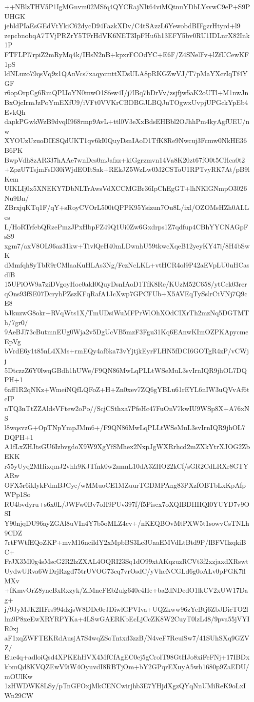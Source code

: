 ++NBlzTHV5P1IgMGnvm02MSfq4QYCRajNIt64viMQtnuYDbLYsvwC9eP+S9PUHGK
jebldPIaEsGEdVtYkiC62dycD94FazkXDv/C4tSAzzL6YewobdBIFgzrHtyrd+l9
zepcbnobqA7TVjPRZrY5TFrHdVK6NET3IpFHu6h13EFY5bv0RU1IDLnrX82Ink1P
FTFLPl7rpiZ2mRyMq4k/IHsN2nB+kpxrFCOdYC+E6F/Z4SNelFv+lZfUCewKF1pS
ldNLuzo79qsVq9z1QAnVcs7xaqycmttXDsULA8pRKGZwVJ/T7pMaYXcrIqTf4YGF
r6opOrpCg6RmQPIJoYN0mwO1Sfew4I/j7lBq7bDrVv/zsjfjw5aK2oUTl+M1nwJn
BxOjcIrmJzPoYmEXfU9/iVFt0VVKrCBDBGJLBQJuTOgwxUvpjUPGckYpEb4EvkQh
dapkPGwkWzB9dvqlI968rmp9AvL+ttl0V3eXxBdsEHBbl2OJhhPm4kyAgfUEU/nw
XYOUzUzuoDIESQdUKT1qv6kI0QuyDsnIAoD1TfK8Re9Nwcuj3Fcmw0NkHE36B6PK
BwpVdh8zAR337hAAe7wnDcs0mJafzz+kiGgrzmvn14Va8K20zt67fO0t5CHca0t2
+ZpzU7TsjmFsD30iWjdEOItSak+REkJZ5WzLw0M2CSToU1RPTvyRK7At/pB9lKem
UIKLIj0x5XNEKY7DbNLTrAwsVdXCCMGBr36IpChEgGT+lhNKlGNmpO3026Nu9Bn/
ZBrxjqKTq1F/qY+sRoyCVOrL500tQPPK95Ysizun7Ou8L/ixl/OZOMsHZh0ALLes
L/HoRTrfebQRzePmzJPxHbpFZ49Q1Ui0Zw6Gxdrps1Z7qdfup4CBhYYCNAGpFsS9
xgm7/axV8OL96az31kw+TivlQeH40mLDwnhU59tkwcXqeB12yeyKY47i/8H4bSwK
dMmfqh8yTbR9rCMlaaKuHLAs3Ng/FczNcLKL+vtHCR4ol9P42aEVpLU0uHCasdlB
15UPiOW9a7ziDVgoyHoe0akI0QuyDsnIAoD1TfK8Re/KUzM52C658/ytCck03rer
qOns93fSE07DcryhPZszKFqRafA1JcXwp7GPCFUb+X5AVEqTySslrCtVNj7Q9cE8
bJkuzwG8okr+RVqWts1X/TmUDsiWuMFPrWlOhXOdCIXrTh2mzNq5DGTMTh/7gr0/
9AeBJl73cButmnEUg0Wja2v5DgUcVB5mzF3Fgu31Kq6EAnwKImOZPKApycmeEpVg
bVrdE6y1t85nL4XMs+rmEQy4af6ka73vYjtjkEyrFLHN5fDCI6GOTgR4zP/vCWjj
5DtczzZ6Y0lwqGBdh1hUWe/F9QN86MwLqPLLtWSeMuL3svIrnIQR9jhOL7DQPH+1
6aff1R2qNKz+WmeiNQfLQFoZ+H+Zn0xev7ZQ6gYBLu61rEYL6nIW3uQVvAf6tcIP
nTQ3nTtZZAldsVFtew2oPo//ScjCSthxa7PfeHc47FuOnV7kwIU9WSp8X+A76xNS
l8wqsvzG+OpTNpYmpJMm6+/F9QN86MwLqPLLtWSeMuL3svIrnIQR9jhOL7DQPH+1
A1fLxZHJtsGU6IzbvgdoX9W9XgYfSMhex2NxpJgWXRrhcd2mZXkYtrXJOG2ZbEKK
r55yUyq2MHixqmJ2vhh9KJTfnk0w2zmnL10dA3ZHO22kCf/sGR2CdLRXr8GTYARw
OFX5r6iklykPdmBJCye/wMMuoCE1MZuurTGDMPAng83PXzfOBTbLxKpAfpWPp1So
RU4bvdyru+s6x0L/JWFw0Bv7oH9PUv397f/f5Pisex7oXQIBDHHQI0YUYD7v9OSI
Y90njqDU96ayZGAl8uVIn4Y7b5oMLZ4cv+/nKEQBOvMtPXW5t1sowvCsTNLh9CDZ
7rtFWtfEQoZKP+mvM16ncildY2xMpbBS3Lc3UaaEMVdLtBtd9P/lBFVIlzqkiBC+
FrJX3Ml0g4sMscG2R2lzZXAL4OQRI23Sq1dO99xtAKqzuzRCVt3f2xzjaxdXRswt
UydwURva6WDrjRzgd75trUVOG73cq7vrOsdC/yVhcNCGLd6g0oALv0pPGK7flMXv
+fKmvOrZ8yneBxRxzyk/ZlMncFEb2ulg640c4He+ba2dNDedO1lkCV2xUW17Dag+
j/9JyMJK2HFrs994dzjsW8DDc0eJDiwlGPVIva+UQZkww96zYeBtj6ZbJDicTO2l
lm9P8xeEwXRYRPYKa+4LSwGAERKbEcLjCcZK8W2CuyT0lzL48/9pva55jVYIR0xj
aF1xqZWFTEKRdAusjA7S4wqZSoTntxd3zzB/N4veF7ReuiSw7/41SUhSXq9GZVZ/
Eue4q+adloiQsd4XPKEhHVX4MfCfAgEC0ej5gCrolT98GtHJo8xiFeFNj+17IBDx
kbmQd8KVQZEwV9iW4OyuvdI8RBTjOm+bY2GPqrEXuyA5wh1680p9ZaEDU/mOUlKw
1zHWDWK8LSy/pTnGFOxjMkCENCwirjhb3E7YHjdXgzQYqNnUMiReK9oLxIWn29CW
